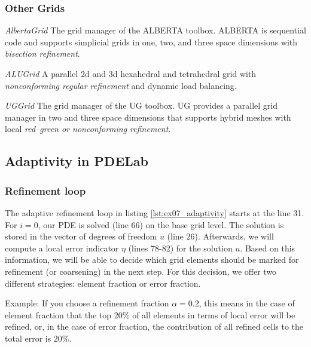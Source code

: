 \begin{frame}
  \frametitle<presentation>{Other Grids}

  \begin{block}{\emph{AlbertaGrid}}
    The grid manager of the ALBERTA toolbox.
    ALBERTA is sequential code and supports simplicial grids in one, two, and
    three space dimensions with \emph{bisection refinement}.

  \end{block}

  \begin{block}{\emph{ALUGrid}}
    A parallel 2d and 3d hexahedral and tetrahedral grid with \emph{nonconforming regular refinement} and dynamic load balancing.

  \end{block}

  \begin{block}{\emph{UGGrid}}
    The grid manager of the UG toolbox.
    UG provides a parallel grid manager in two and three space dimensions
    that supports hybrid meshes with local \emph{red--green or nonconforming
    refinement}.


  \end{block}
\end{frame}


\subsection{Adaptivity in PDELab}

\subsubsection*{Refinement loop}

The adaptive refinement loop in listing \ref{lst:ex07_adaptivity} starts at the line 31. For $i=0$, our
PDE is solved (line 66) on the base grid level. The solution is stored in the
vector of degrees of freedom $u$ (line 26). Afterwards, we will compute
a local error indicator $\eta$ (lines 78-82) for the solution $u$.
Based on this information, we will be able to decide which grid elements
should be marked for refinement (or coarsening) in the next step.
For this decision, we offer two different strategies: element fraction or error fraction.

Example: If you choose a refinement fraction $\alpha=0.2$, this means in the
case of element fraction that the top $20\%$ of all
elements in terms of local error will be refined, or, in the case of error
fraction, the contribution of all refined cells to the total error is $20\%$.

